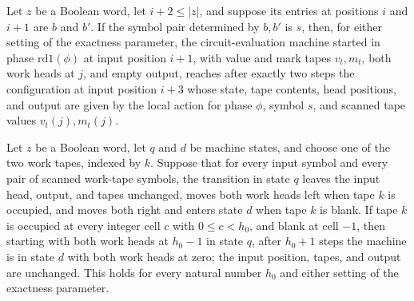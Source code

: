 \begin{theorem}
\label{BoolCircuit.CircuitEval.lstep}
\leanok
{}
Let $z$ be a Boolean word, let $i+2\le |z|$, and suppose its entries at positions $i$
and $i+1$ are $b$ and $b'$. If the symbol pair determined by $b,b'$ is $s$, then, for
either setting of the exactness parameter, the circuit-evaluation machine started in
phase $\mathrm{rd1}(\phi)$ at input position $i+1$, with value and mark tapes $v_t,m_t$,
both work heads at $j$, and empty output, reaches after exactly two steps the
configuration at input position $i+3$ whose state, tape contents, head positions, and
output are given by the local action for phase $\phi$, symbol $s$, and scanned tape
values $v_t(j),m_t(j)$.
\end{theorem}

\begin{theorem}
\label{BoolCircuit.CircuitEval.rew}
\leanok
{}
Let $z$ be a Boolean word, let $q$ and $d$ be machine states, and choose one of the two
work tapes, indexed by $k$. Suppose that for every input symbol and every pair of
scanned work-tape symbols, the transition in state $q$ leaves the input head, output,
and tapes unchanged, moves both work heads left when tape $k$ is occupied, and moves
both right and enters state $d$ when tape $k$ is blank. If tape $k$ is occupied at every
integer cell $c$ with $0\le c<h_0$, and blank at cell $-1$, then starting with both work
heads at $h_0-1$ in state $q$, after $h_0+1$ steps the machine is in state $d$ with both
work heads at zero; the input position, tapes, and output are unchanged. This holds for
every natural number $h_0$ and either setting of the exactness parameter.
\end{theorem}

